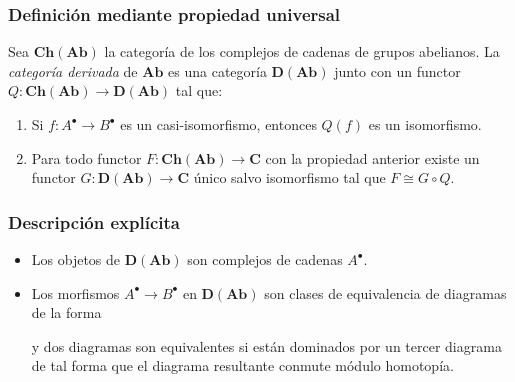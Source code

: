 \documentclass[12pt]{beamer}
\begin{document}
\begin{frame}
  \frametitle{Definición mediante propiedad universal}
  Sea $\mathbf{Ch}(\mathbf{Ab})$ la categoría de los complejos de cadenas de grupos abelianos.
  \pause
  La \textit{categoría derivada} de $\mathbf{Ab}$ es una categoría $\mathbf{D}(\mathbf{Ab})$ junto con un functor $Q \colon \mathbf{Ch}(\mathbf{Ab}) \to \mathbf{D}(\mathbf{Ab})$ tal que:
  \pause
  \begin{enumerate}
    \item Si $f \colon A^{\bullet} \to B^{\bullet}$ es un casi-isomorfismo, entonces $Q(f)$ es un isomorfismo.
      \pause
    \item Para todo functor $F \colon \mathbf{Ch}(\mathbf{Ab}) \to \mathbf{C}$ con la propiedad anterior existe un functor $G \colon \mathbf{D}(\mathbf{Ab}) \to \mathbf{C}$ único salvo isomorfismo tal que $F \cong G \circ Q$.
  \end{enumerate}
  \begin{center}
  \end{center}
\end{frame}

\begin{frame}
  \frametitle{Descripción explícita}
  \begin{itemize}
    \item Los objetos de $\mathbf{D}(\mathbf{Ab})$ son complejos de cadenas $A^{\bullet}$.
      \pause
    \item Los morfismos $A^{\bullet} \to B^{\bullet}$ en $\mathbf{D}(\mathbf{Ab})$ son clases de equivalencia de diagramas de la forma
      \begin{center}
      \end{center}
      \pause
      y dos diagramas son equivalentes si están dominados por un tercer diagrama de tal forma que el diagrama resultante conmute módulo homotopía.
  \end{itemize}
\end{frame}
\end{document}
